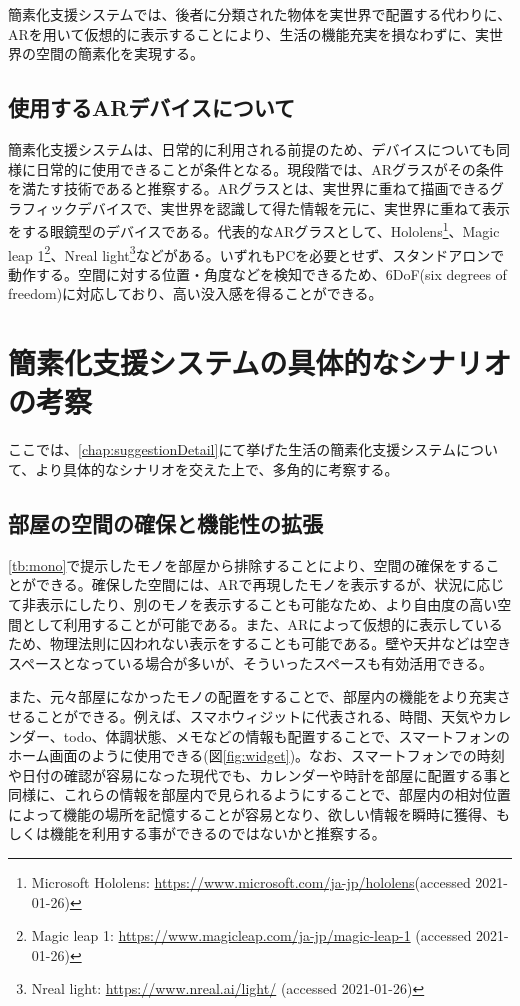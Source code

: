 簡素化支援システムでは、後者に分類された物体を実世界で配置する代わりに、ARを用いて仮想的に表示することにより、生活の機能充実を損なわずに、実世界の空間の簡素化を実現する。

\subsection{使用するARデバイスについて}
\label{chap:ARdevice}

簡素化支援システムは、日常的に利用される前提のため、デバイスについても同様に日常的に使用できることが条件となる。現段階では、ARグラスがその条件を満たす技術であると推察する。ARグラスとは、実世界に重ねて描画できるグラフィックデバイスで、実世界を認識して得た情報を元に、実世界に重ねて表示をする眼鏡型のデバイスである。代表的なARグラスとして、Hololens\footnote{Microsoft Hololens: \url{https://www.microsoft.com/ja-jp/hololens}(accessed 2021-01-26)}、Magic leap 1\footnote{Magic leap 1: \url{https://www.magicleap.com/ja-jp/magic-leap-1} (accessed 2021-01-26)}、Nreal light\footnote{Nreal light: \url{https://www.nreal.ai/light/} (accessed 2021-01-26)}などがある。いずれもPCを必要とせず、スタンドアロンで動作する。空間に対する位置・角度などを検知できるため、6DoF(six degrees of freedom)に対応しており、高い没入感を得ることができる。

\newpage

\section{簡素化支援システムの具体的なシナリオの考察}

ここでは、\ref{chap:suggestionDetail}にて挙げた生活の簡素化支援システムについて、より具体的なシナリオを交えた上で、多角的に考察する。

\subsection{部屋の空間の確保と機能性の拡張}

\ref{tb:mono}で提示したモノを部屋から排除することにより、空間の確保をすることができる。確保した空間には、ARで再現したモノを表示するが、状況に応じて非表示にしたり、別のモノを表示することも可能なため、より自由度の高い空間として利用することが可能である。また、ARによって仮想的に表示しているため、物理法則に囚われない表示をすることも可能である。壁や天井などは空きスペースとなっている場合が多いが、そういったスペースも有効活用できる。

また、元々部屋になかったモノの配置をすることで、部屋内の機能をより充実させることができる。例えば、スマホウィジットに代表される、時間、天気やカレンダー、todo、体調状態、メモなどの情報も配置することで、スマートフォンのホーム画面のように使用できる(図\ref{fig:widget})。なお、スマートフォンでの時刻や日付の確認が容易になった現代でも、カレンダーや時計を部屋に配置する事と同様に、これらの情報を部屋内で見られるようにすることで、部屋内の相対位置によって機能の場所を記憶することが容易となり、欲しい情報を瞬時に獲得、もしくは機能を利用する事ができるのではないかと推察する。

